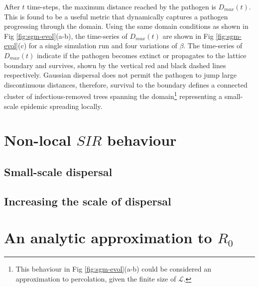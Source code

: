 After $t$ time-steps, the maximum distance reached by the pathogen is $D_{max}(t)$. This is found to be a useful metric that dynamically captures a pathogen progressing through the domain. Using the same domain conditions as shown in Fig \ref{fig:sgm-evol}(a-b), the time-series of $D_{max}(t)$ are shown in Fig \ref{fig:sgm-evol}(c) for a single simulation run and four variations of $\beta$. The time-series of $D_{max}(t)$ indicate if the pathogen becomes extinct or propagates to the lattice boundary and survives, shown by the vertical red and black dashed lines respectively. Gaussian dispersal does not permit the pathogen to jump large discontinuous distances, therefore, survival to the boundary defines a connected cluster of infectious-removed trees spanning the domain\footnote{This behaviour in Fig \ref{fig:sgm-evol}(a-b) could be considered an approximation to percolation, given the finite size of $\mathcal{L}$.} representing a small-scale epidemic spreading locally.\\


\section{Non-local $SIR$ behaviour}

\blindtext

\subsection{Small-scale dispersal}

\blindtext %

\subsection{Increasing the scale of dispersal}

\blindtext

\blindtext


\section{An analytic approximation to $R_0$}

